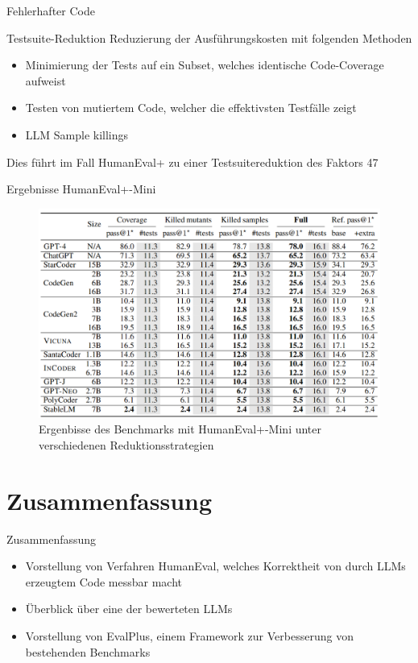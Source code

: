 \documentclass{beamer}              %
\begin{document}
\begin{frame}{Fehlerhafter Code}
\begin{frame}{Testsuite-Reduktion}
Reduzierung der Ausführungskosten mit folgenden Methoden\cite{liu2024your}
\begin{itemize}
    \item Minimierung der Tests auf ein Subset, welches identische Code-Coverage aufweist
    \item Testen von mutiertem Code, welcher die effektivsten Testfälle zeigt
    \item LLM Sample killings
\end{itemize}
Dies führt im Fall HumanEval+ zu einer Testsuitereduktion des Faktors 47
\end{frame}

\begin{frame}{Ergebnisse HumanEval+-Mini}
    \begin{figure}
        \centering
        \includegraphics[width=0.8\paperwidth]{images/reducedresults.png}
        \caption{Ergenbisse des Benchmarks mit HumanEval+-Mini unter verschiedenen Reduktionsstrategien\cite{liu2024your}}
    \end{figure}
\end{frame}

\section{Zusammenfassung}
\begin{frame}{Zusammenfassung}
\begin{itemize}
    \item Vorstellung von Verfahren HumanEval, welches Korrektheit von durch LLMs erzeugtem Code messbar macht
    \item Überblick über eine der bewerteten LLMs
    \item Vorstellung von EvalPlus, einem Framework zur Verbesserung von bestehenden Benchmarks
\end{itemize}
\end{frame}


\end{frame}
\end{document}
